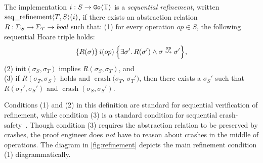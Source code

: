 \begin{definition}
  The implementation $i : S \to \mathtt{Go}\langle \mathrm{T} \rangle$ is a \emph{sequential
    refinement}, written
  $\operatorname{seq\_refinement} \langle T, S \rangle(i)$, if there exists an abstraction relation
  $R : \Sigma_{S} \to \Sigma_{T} \to \textit{bool}$ such that: \newline
(1) for every operation
  $op \in S$, the following sequential Hoare triple holds:
  \[
    \hoare{R(\sigma)}{i(op)}{\exists \sigma'.\, R(\sigma') \land \sigma \overset{op}{\leadsto} \sigma'},
  \]
(2) $\mathrm{init}(\sigma_{S}, \sigma_{T})$ implies
$R(\sigma_{S}, \sigma_{T})$, and \\
(3) if $R(\sigma_{T}, \sigma_{S})$ holds and $\operatorname{crash}(\sigma_{T}$, $\sigma_{T}')$,
then there exists a $\sigma_{S}'$ such that $R(\sigma_{T}', \sigma_{S}')$ and
$\operatorname{crash}(\sigma_{S}, \sigma_{S}')$.%
  \label{def:seqrefinement}
\end{definition}
%
Conditions (1) and (2) in this definition are standard for sequential
verification of refinement, while condition (3) is a standard condition for sequential crash-safety~\citep{chajed:argosy}. Though condition (3) requires the
abstraction relation to be preserved by crashes, the proof engineer does \emph{not} have to reason about crashes in the middle of operations.
The
diagram in \cref{fig:refinement} depicts the main
refinement condition (1) diagrammatically. 

